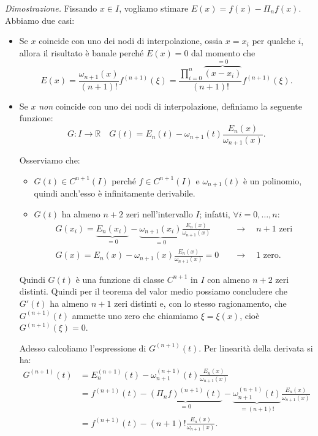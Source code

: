 \textit{Dimostrazione.}
Fissando $x\in I$, vogliamo stimare $E(x) =f(x) -\Pi _{n} f(x)$. Abbiamo due casi:
\begin{itemize}
\item Se $x$ coincide con uno dei nodi di interpolazione, ossia $x=x_{i}$ per qualche $i$, allora il risultato è banale perché $E(x) =0$ dal momento che
\begin{equation*}
E(x) =\frac{\omega _{n+1}(x)}{( n+1) !} f^{( n+1)}( \xi ) =\frac{\prod\nolimits ^{n}_{i=0}\overbrace{( x-x_{i})}^{=0}}{( n+1) !} f^{( n+1)}( \xi ).
\end{equation*}
\item Se $x$ \textit{non} coincide con uno dei nodi di interpolazione, definiamo la seguente funzione:
\begin{equation*}
G:I\rightarrow \mathbb{R} \quad G(t) =E_{n}(t) -\omega _{n+1}(t)\frac{E_{n}(x)}{\omega _{n+1}(x)}.
\end{equation*}

Osserviamo che:
\begin{itemize}
\item $G(t) \in C^{n+1}(I)$ perché $f\in C^{n+1}(I)$ e $\omega _{n+1}(t)$ è un polinomio, quindi anch'esso è infinitamente derivabile.
\item $G(t)$ ha almeno $n+2$ zeri nell'intervallo $I$; infatti, $\forall i=0,\dotsc ,n$:
\begin{align*}
	G( x_{i}) =\underbrace{E_{n}( x_{i})}_{=0} -\underbrace{\omega _{n+1}( x_{i})}_{=0}\frac{E_{n}(x)}{\omega _{n+1}(x)} & \quad \rightarrow \quad n+1 \text{ zeri} \\
	G(x) =E_{n}(x) -\omega _{n+1}(x)\frac{E_{n}(x)}{\omega _{n+1}(x)} =0 & \quad \rightarrow \quad 1 \text{ zero.}
\end{align*}
\end{itemize}

Quindi $G(t)$ è una funzione di classe $C^{n+1}$ in $I$ con almeno $n+2$ zeri distinti. Quindi per il teorema del valor medio possiamo concludere che $G'(t)$ ha almeno $n+1$ zeri distinti e, con lo stesso ragionamento, che $G^{( n+1)}(t)$ ammette uno zero che chiamiamo $\xi =\xi (x)$, cioè $G^{( n+1)}( \xi ) =0$.

Adesso calcoliamo l'espressione di $G^{( n+1)}(t)$. Per linearità della derivata si ha:
\begin{align*}
G^{( n+1)}(t) & =E^{( n+1)}_{n}(t) -\omega ^{( n+1)}_{n+1}(t)\frac{E_{n}(x)}{\omega _{n+1}(x)}\\
 & =f^{( n+1)}(t) -\underbrace{( \Pi _{n} f)^{( n+1)}(t)}_{=0} -\underbrace{\omega ^{( n+1)}_{n+1}(t)}_{=( n+1) !}\frac{E_{n}(x)}{\omega _{n+1}(x)}\\
 & =f^{( n+1)}(t) -( n+1) !\frac{E_{n}(x)}{\omega _{n+1}(x)}.
\end{align*}


\end{itemize}
